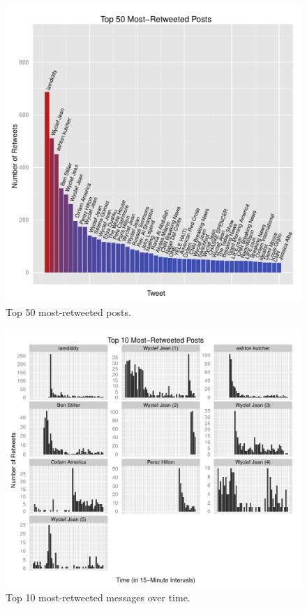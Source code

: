\documentclass[a4paper, 11pt, titlepage]{article}
\begin{document}
\begin{figure}[h]
\centering
\includegraphics[width=120mm]{../figures/rt_top_50}
\caption{Top 50 most-retweeted posts.}
\label{fig:rt_top_50}
\end{figure}

\begin{figure}[h]
  \centering
\includegraphics[width=120mm]{../figures/rt_top_10_over_time_free_scale}
\caption{Top 10 most-retweeted messages over time.}
\label{fig:rt_top_10}
\end{figure}
\end{document}
